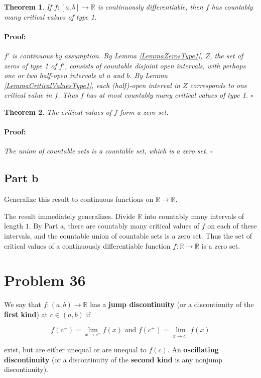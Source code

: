 \documentclass{article}
\newenvironment{proof}{\paragraph{Proof:}}{\hfill$\square$}
\newtheorem{theorem}{Theorem}
\newcommand{\R}{\mathbb{R}}
\begin{document}
\begin{theorem}
If $f: [a, b] \rightarrow \R$ is continuously differentiable, then $f$ has countably many critical values of type 1.
\begin{proof}
$f'$ is continuous by assumption. By Lemma \ref{LemmaZerosType1}, $Z$, the set of zeros of type 1 of $f'$, consists of countable disjoint open intervals, with perhaps one or two half-open intervals at $a$ and $b$. By Lemma \ref{LemmaCriticalValuesType1}, each (half)-open interval in $Z$ corresponds to one critical value in $f$. Thus $f$ has at most countably many critical values of type 1.
\end{proof}
\end{theorem}

\begin{theorem}
The critical values of $f$ form a zero set.
\begin{proof}
The union of countable sets is a countable set, which is a zero set.
\end{proof}
\end{theorem}

\subsection*{Part b}

Generalize this result to continuous functions on $\R \rightarrow \R$.

The result immediately generalizes. Divide $\R$ into countably many intervals of length $1$. By Part a, there are countably many critical values of $f$ on each of these intervals, and the countable union of countable sets is a zero set. Thus the set of critical values of a continuously differentiable function $f: \R \rightarrow \R$ is a zero set. 

\section*{Problem 36}

We say that $f: (a, b) \rightarrow \R$ has a \textbf{jump discontinuity} (or a discontinuity of the \textbf{first kind}) at $c \in (a, b)$ if

\[
f(c^-) = \lim_{x \rightarrow c^-} f(x) \text{ and } f(c^+) = \lim_{x \rightarrow c^+} f(x)
\]

exist, but are either unequal or are unequal to $f(c)$. An \textbf{oscillating discontinuity} (or a discontinuity of the \textbf{second kind} is any nonjump discontinuity).
\end{document}
